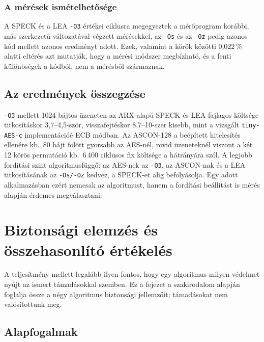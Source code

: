 \documentclass[a4paper,12pt]{report}
\theoremstyle{definition}
\theoremstyle{remark}
\begin{document}
\subsection{A mérések ismételhetősége}

A SPECK és a LEA \texttt{-O3} értékei ciklusra megegyeztek a mérőprogram korábbi, más szerkezetű változatával végzett mérésekkel, az \texttt{-Os} és az \texttt{-Oz} pedig azonos kód mellett azonos eredményt adott. Ezek, valamint a körök közötti 0,022\,\% alatti eltérés azt mutatják, hogy a mérési módszer megbízható, és a fenti különbségek a kódból, nem a mérésből származnak.

\section{Az eredmények összegzése}\label{sec:osszesites}

\texttt{-O3} mellett 1024 bájtos üzeneten az ARX-alapú SPECK és LEA fajlagos költsége titkosításkor 3,7--4,5-ször, visszafejtéskor 8,7--10-szer kisebb, mint a vizsgált \texttt{tiny-AES-c} implementációé ECB módban. Az ASCON-128 a beépített hitelesítés ellenére kb.\ 80 bájt fölött gyorsabb az AES-nél, rövid üzeneteknél viszont a két 12 körös permutáció kb.\ 6\,400 ciklusos fix költsége a hátrányára szól. A legjobb fordítási szint algoritmusfüggő: az AES-nek az \texttt{-O3}, az ASCON-nak és a LEA titkosításának az \texttt{-Os/-Oz} kedvez, a SPECK-et alig befolyásolja. Egy adott alkalmazásban ezért nemcsak az algoritmust, hanem a fordítási beállítást is mérés alapján érdemes megválasztani.

\chapter{Biztonsági elemzés és összehasonlító értékelés}\label{chap:biztonsag}

A teljesítmény mellett legalább ilyen fontos, hogy egy algoritmus milyen védelmet nyújt az ismert támadásokkal szemben. Ez a fejezet a szakirodalom alapján foglalja össze a négy algoritmus biztonsági jellemzőit; támadásokat nem valósítottunk meg.

\section{Alapfogalmak}\label{sec:kriptoanalizis_alap}
\end{document}
